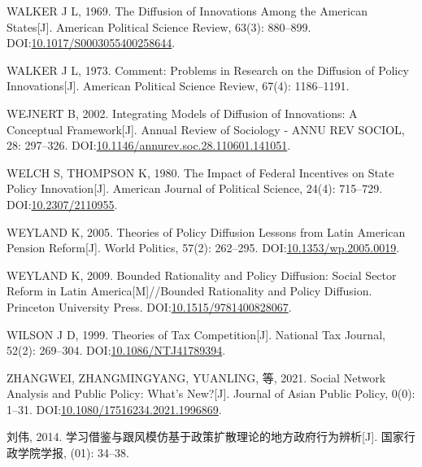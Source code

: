 \documentclass[
  12pt,
]{ctexart}
\newlength{\cslhangindent}
\newlength{\cslentryspacingunit} %
\newenvironment{CSLReferences}[2] %
 {%
  \setlength{\parindent}{0pt}
  \ifodd #1
  \let\oldpar\par
  \def\par{\hangindent=\cslhangindent\oldpar}
  \fi
  \setlength{\parskip}{#2\cslentryspacingunit}
 }%
 {}
\begin{document}
\begin{CSLReferences}{1}{0}
\leavevmode{}%
WALKER J L, 1969. The {Diffusion} of {Innovations} Among the {American States}{[}J{]}. American Political Science Review, 63(3): 880--899. DOI:\href{https://doi.org/10.1017/S0003055400258644}{10.1017/S0003055400258644}.

\leavevmode{}%
WALKER J L, 1973. Comment: {Problems} in Research on the Diffusion of Policy Innovations{[}J{]}. American Political Science Review, 67(4): 1186--1191.

\leavevmode{}%
WEJNERT B, 2002. Integrating {Models} of {Diffusion} of {Innovations}: {A Conceptual Framework}{[}J{]}. Annual Review of Sociology - ANNU REV SOCIOL, 28: 297--326. DOI:\href{https://doi.org/10.1146/annurev.soc.28.110601.141051}{10.1146/annurev.soc.28.110601.141051}.

\leavevmode{}%
WELCH S, THOMPSON K, 1980. The {Impact} of {Federal Incentives} on {State Policy Innovation}{[}J{]}. American Journal of Political Science, 24(4): 715--729. DOI:\href{https://doi.org/10.2307/2110955}{10.2307/2110955}.

\leavevmode{}%
WEYLAND K, 2005. Theories of {Policy Diffusion Lessons} from {Latin American Pension Reform}{[}J{]}. World Politics, 57(2): 262--295. DOI:\href{https://doi.org/10.1353/wp.2005.0019}{10.1353/wp.2005.0019}.

\leavevmode{}%
WEYLAND K, 2009. Bounded {Rationality} and {Policy Diffusion}: {Social Sector Reform} in {Latin America}{[}M{]}//Bounded Rationality and Policy Diffusion. {Princeton University Press}. DOI:\href{https://doi.org/10.1515/9781400828067}{10.1515/9781400828067}.

\leavevmode{}%
WILSON J D, 1999. Theories of {Tax Competition}{[}J{]}. National Tax Journal, 52(2): 269--304. DOI:\href{https://doi.org/10.1086/NTJ41789394}{10.1086/NTJ41789394}.

\leavevmode{}%
ZHANGWEI, ZHANGMINGYANG, YUANLING, 等, 2021. Social Network Analysis and Public Policy: What's New?{[}J{]}. Journal of Asian Public Policy, 0(0): 1--31. DOI:\href{https://doi.org/10.1080/17516234.2021.1996869}{10.1080/17516234.2021.1996869}.

\leavevmode{}%
刘伟, 2014. {学习借鉴与跟风模仿\textemdash\textemdash 基于政策扩散理论的地方政府行为辨析}{[}J{]}. 国家行政学院学报, (01): 34--38.


\end{CSLReferences}
\end{document}

